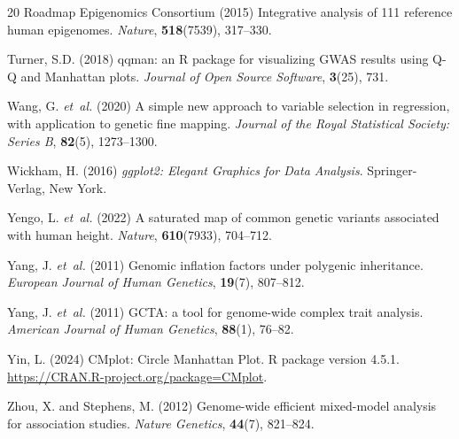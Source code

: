 \documentclass{bioinfo}
\begin{document}
\begin{thebibliography}{20}
{Roadmap Epigenomics Consortium} (2015) Integrative analysis of 111 reference human epigenomes. \textit{Nature}, \textbf{518}(7539), 317--330.

Turner, S.D. (2018) qqman: an R package for visualizing GWAS results using Q-Q and Manhattan plots. \textit{Journal of Open Source Software}, \textbf{3}(25), 731.

Wang, G. {\it et~al.} (2020) A simple new approach to variable selection in regression, with application to genetic fine mapping. \textit{Journal of the Royal Statistical Society: Series B}, \textbf{82}(5), 1273--1300.

Wickham, H. (2016) \textit{ggplot2: Elegant Graphics for Data Analysis}. Springer-Verlag, New York.

Yengo, L. {\it et~al.} (2022) A saturated map of common genetic variants associated with human height. \textit{Nature}, \textbf{610}(7933), 704--712.

Yang, J. {\it et~al.} (2011) Genomic inflation factors under polygenic inheritance. \textit{European Journal of Human Genetics}, \textbf{19}(7), 807--812.

Yang, J. {\it et~al.} (2011) GCTA: a tool for genome-wide complex trait analysis. \textit{American Journal of Human Genetics}, \textbf{88}(1), 76--82.

Yin, L. (2024) CMplot: Circle Manhattan Plot. R package version 4.5.1. \url{https://CRAN.R-project.org/package=CMplot}.

Zhou, X. and Stephens, M. (2012) Genome-wide efficient mixed-model analysis for association studies. \textit{Nature Genetics}, \textbf{44}(7), 821--824.

\end{thebibliography}
\end{document}

